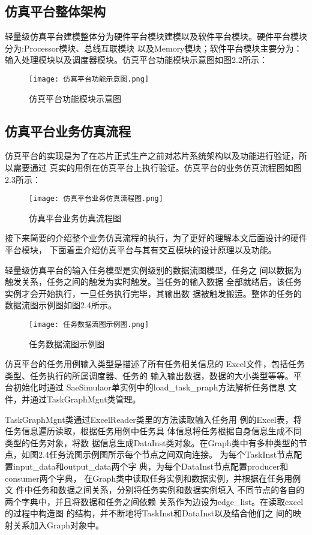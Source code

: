 \subsection{仿真平台整体架构}
轻量级仿真平台建模整体分为硬件平台模块建模以及软件平台模块。硬件平台模块分为:Processor模块、总线互联模块
以及Memory模块；软件平台模块主要分为：输入处理模块以及调度器模块。仿真平台功能模块示意图如图2.2所示：

\begin{figure}
  \centering
  \texttt{[image: 仿真平台功能示意图.png]}
  \caption{仿真平台功能模块示意图}
  \label{fig:badge}
\end{figure}

\subsection{仿真平台业务仿真流程}
仿真平台的实现是为了在芯片正式生产之前对芯片系统架构以及功能进行验证，所以需要通过
真实的用例在仿真平台上执行验证。仿真平台的业务仿真流程图如图2.3所示：

\begin{figure}
  \centering
  \texttt{[image: 仿真平台业务仿真流程图.png]}
  \caption{仿真平台业务仿真流程图}
  \label{fig:badge}
\end{figure}

接下来简要的介绍整个业务仿真流程的执行，为了更好的理解本文后面设计的硬件平台模块，
下面着重介绍仿真平台与其有交互模块的设计原理以及功能。

轻量级仿真平台的输入任务模型是实例级别的数据流图模型，任务之
间以数据为触发关系，任务之间的触发为实时触发。当任务的输入数据
全部就绪后，该任务实例才会开始执行，一旦任务执行完毕，其输出数
据被触发搬运。整体的任务的数据流图示例图如图2.4所示。

\begin{figure}
    \centering
    \texttt{[image: 任务数据流图示例图.png]}
    \caption{任务数据流图示例图}
    \label{fig:badge}
\end{figure}

仿真平台的任务用例输入类型是描述了所有任务相关信息的
Excel文件，包括任务类型、任务执行的所属调度器、任务的
输入输出数据，数据的大小类型等等。平台初始化时通过
SaeSimulaor单实例中的load\_task\_praph方法解析任务信息
文件，并通过TaskGraphMgnt类管理。

TaskGraphMgnt类通过ExcelReader类里的方法读取输入任务用
例的Excel表，将任务信息遍历读取，根据任务用例中任务具
体信息将任务根据自身信息生成不同类型的任务对象，将数
据信息生成DataInst类对象。在Graph类中有多种类型的节
点，如图2.4任务流图示例图所示每个节点之间双向连接。
为每个TaskInst节点配置input\_data和output\_data两个字
典，为每个DataInst节点配置producer和consumer两个字典，
在Graph类中读取任务实例和数据实例，并根据在任务用例文
件中任务和数据之间关系，分别将任务实例和数据实例填入
不同节点的各自的两个字典中，并且将数据和任务之间依赖
关系作为边设为edge\_list。在读取excel的过程中构造图
的结构，并不断地将TaskInst和DataInst以及结合他们之
间的映射关系加入Graph对象中。

